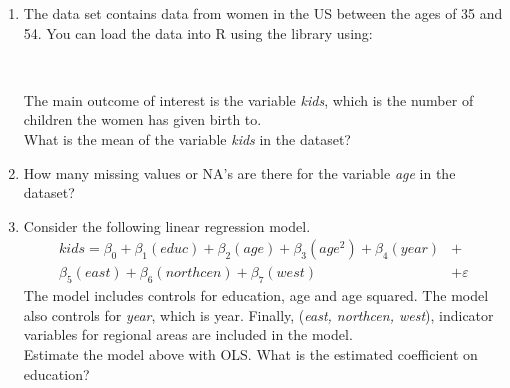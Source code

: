 \def\examid{26101200001}

\begin{enumerate}
\item {}
The data set  contains data from women in the US between the ages of 35 and 54. You can load the data into R using the  library using:

\medskip
{}\\
\medskip

The main outcome of interest is the variable \textit{kids}, which is the number of children the women has given birth to.\\
What is the mean of the variable \textit{kids} in the dataset?

\item How many missing values or NA's are there for the variable \textit{age} in the dataset?

\item Consider the following linear regression model.
\[\begin{aligned}
kids = \beta_0 + \beta_1(educ) + \beta_2(age) + \beta_3(age^2) + \beta_4(year) &+ \\
\beta_5(east) + \beta_6(northcen) + \beta_7(west) &+ \varepsilon
\end{aligned}\]
The model includes controls for education, age and age squared. The model also controls for \textit{year}, which is year. Finally, (\textit{east, northcen, west}), indicator variables for regional areas are included in the model.\\
Estimate the model above with OLS. What is the estimated coefficient on education?


\end{enumerate}
